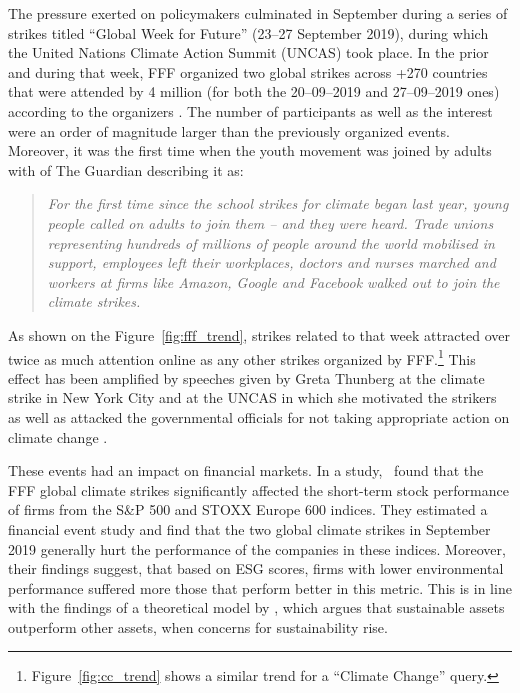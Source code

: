 \documentclass[12pt]{article}
\begin{document}
The pressure exerted on policymakers culminated in September during a series of strikes titled ``Global Week for Future'' (23--27 September 2019), during which the United Nations Climate Action Summit (UNCAS) took place. In the prior and during that week, FFF organized two global strikes across +270 countries that were attended by 4 million (for both the 20--09--2019 and 27--09--2019 ones) according to the organizers \parencite{fffStrikeStats}. The number of participants as well as the interest were an order of magnitude larger than the previously organized events. Moreover, it was the first time when the youth movement was joined by adults with \citeauthor{watts2019climate} of The Guardian describing it as:

\begin{quote}
    \small
    \textit{For the first time since the school strikes for climate began last year, young people called on adults to join them – and they were heard. Trade unions representing hundreds of millions of people around the world mobilised in support, employees left their workplaces, doctors and nurses marched and workers at firms like Amazon, Google and Facebook walked out to join the climate strikes.} \parencite{watts2019climate}
\end{quote}

As shown on the Figure~\ref{fig:fff_trend}, strikes related to that week attracted over twice as much attention online as any other strikes organized by FFF.\footnote{Figure~\ref{fig:cc_trend} shows a similar trend for a ``Climate Change'' query.} This effect has been amplified by speeches given by Greta Thunberg at the climate strike in New York City and at the UNCAS in which she motivated the strikers as well as attacked the governmental officials for not taking appropriate action on climate change \parencite{2019thunberg}. 

These events had an impact on financial markets. In a \citeyear{schusterStockPriceReactions2023} study,~\citeauthor{schusterStockPriceReactions2023} found that the FFF global climate strikes significantly affected the short-term stock performance of firms from the S\&P 500 and STOXX Europe 600 indices. They estimated a financial event study and find that the two global climate strikes in September 2019 generally hurt the performance of the companies in these indices. Moreover, their findings suggest, that based on ESG scores, firms with lower environmental performance suffered more those that perform better in this metric.  This is in line with the findings of a theoretical model by \textcite{pastorSustainableInvestingEquilibrium2021}, which argues that sustainable assets outperform other assets, when concerns for sustainability rise.
\end{document}
